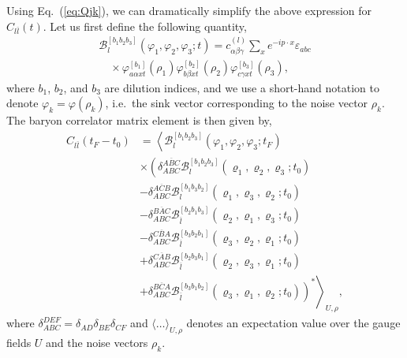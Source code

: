 Using Eq.~(\ref{eq:Qjk}), we can dramatically simplify the above expression for $C_{l\overline l}(t)$. Let us first define the following quantity,
\begin{equation}\label{eq:baryon_func}
    \begin{array}{l}
        \mathcal{B}_{l}^{\left[b_{1} b_{2} b_{3}\right]}\left(\varphi_{1}, \varphi_{2}, \varphi_{3} ; t\right)=c_{\alpha \beta \gamma}^{(l)} \sum_{x} e^{-i p \cdot x} \varepsilon_{a b c} \\
        \quad \times \varphi_{a \alpha x t}^{\left[b_{1}\right]}\left(\rho_{1}\right) \varphi_{b \beta x t}^{[b_2]}\left(\rho_{2}\right) \varphi_{c \gamma x t}^{\left[b_{3}\right]}\left(\rho_{3}\right),
        \end{array}
\end{equation}
where $b_1$, $b_2$, and $b_3$ are dilution indices, and we use a short-hand notation to denote $\varphi_k = \varphi(\rho_k)$, i.e.\ the sink vector corresponding to the noise vector $\rho_k$. The baryon correlator matrix element is then given by,
\begin{equation}\label{eq:corr_fac}
    \begin{aligned}
        C_{l \overline{l}}\left(t_{F}-t_{0}\right) &=\left\langle\mathcal{B}_{l}^{\left[b_{1} b_{2} b_{3}\right]}\left(\varphi_{1}, \varphi_{2}, \varphi_{3} ; t_{F}\right)\right.\\
        & \times\left(\delta_{A B C}^{\overline{A B C}} \mathcal{B}_{l}^{\left[b_{1} b_{2} b_{3}\right]}\left(\varrho_{1}, \varrho_{2}, \varrho_{3} ; t_{0}\right)\right.\\
        &-\delta_{A B C}^{\overline{A C B}} \mathcal{B}_{l}^{\left[b_{1} b_{3} b_{2}\right]}\left(\varrho_{1}, \varrho_{3}, \varrho_{2} ; t_{0}\right) \\
        &-\delta_{A B C}^{\overline{B A C}} \mathcal{B}_{\overline{l}}^{\left[b_{2} b_{1} b_{3}\right]}\left(\varrho_{2}, \varrho_{1}, \varrho_{3} ; t_{0}\right) \\
        &-\delta_{A B C}^{\overline{C B A}} \mathcal{B}_{\overline{l}}^{\left[b_{3} b_{2} b_{1}\right]}\left(\varrho_{3}, \varrho_{2}, \varrho_{1} ; t_{0}\right) \\
        &+\delta_{A B C}^{\overline{C A B}} \mathcal{B}_{\overline{l}}^{\left[b_{2} b_{3} b_{1}\right]}\left(\varrho_{2}, \varrho_{3}, \varrho_{1} ; t_{0}\right) \\
        &\left.\left.+\delta_{A B C}^{\overline{B C A}} \mathcal{B}_{\overline{l}}^{\left[b_{3} b_{1} b_{2}\right]}\left(\varrho_{3}, \varrho_{1}, \varrho_{2} ; t_{0}\right)\right)^{*}\right\rangle_{U, \rho},
    \end{aligned}
\end{equation}
where $\delta_{A B C}^{D E F}=\delta_{A D} \delta_{B E} \delta_{C F}$ and $\langle\ldots\rangle_{U, \rho}$ denotes an expectation value over the gauge fields $U$ and the noise vectors $\rho_k$.

